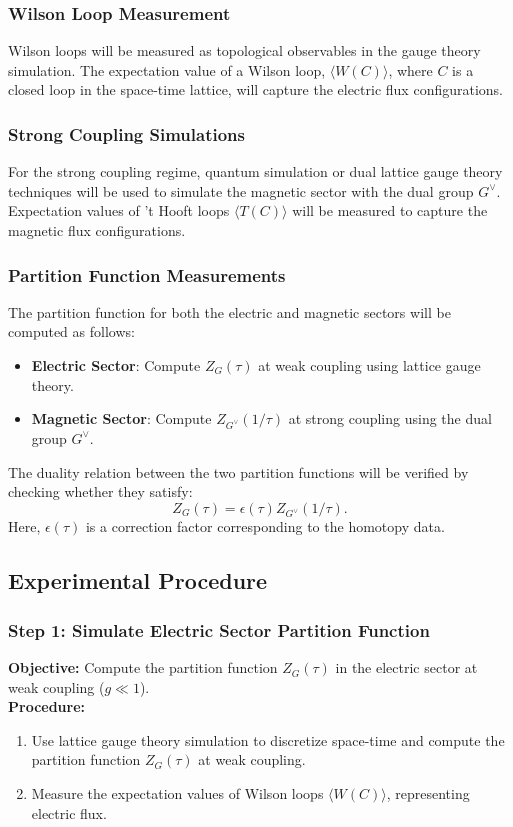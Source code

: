 \documentclass{article}
\theoremstyle{remark}
\begin{document}
\subsubsection{Wilson Loop Measurement}
Wilson loops will be measured as topological observables in the gauge theory simulation. The expectation value of a Wilson loop, $ \langle W(C) \rangle $, where $ C $ is a closed loop in the space-time lattice, will capture the electric flux configurations.

\subsubsection{Strong Coupling Simulations}
For the strong coupling regime, quantum simulation or dual lattice gauge theory techniques will be used to simulate the magnetic sector with the dual group $ G^\vee $. Expectation values of 't Hooft loops $ \langle T(C) \rangle $ will be measured to capture the magnetic flux configurations.

\subsubsection{Partition Function Measurements}
The partition function for both the electric and magnetic sectors will be computed as follows:
\begin{itemize}
    \item \textbf{Electric Sector}: Compute $ Z_G(\tau) $ at weak coupling using lattice gauge theory.
    \item \textbf{Magnetic Sector}: Compute $ Z_{G^\vee}(1/\tau) $ at strong coupling using the dual group $ G^\vee $.
\end{itemize}
The duality relation between the two partition functions will be verified by checking whether they satisfy:
\begin{equation}
Z_G(\tau) = \epsilon(\tau) Z_{G^\vee}(1/\tau).
\end{equation}
Here, $ \epsilon(\tau) $ is a correction factor corresponding to the homotopy data.

\subsection{Experimental Procedure}

\subsubsection{Step 1: Simulate Electric Sector Partition Function}
\textbf{Objective:} Compute the partition function $ Z_G(\tau) $ in the electric sector at weak coupling ($ g \ll 1 $).\\
\textbf{Procedure:}
\begin{enumerate}
    \item Use lattice gauge theory simulation to discretize space-time and compute the partition function $ Z_G(\tau) $ at weak coupling.
    \item Measure the expectation values of Wilson loops $ \langle W(C) \rangle $, representing electric flux.
\end{enumerate}
\end{document}

